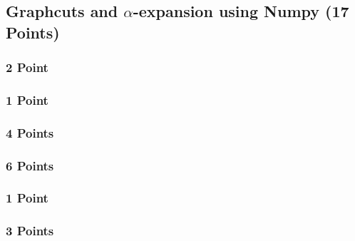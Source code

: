 \newif\ifvimbug
\vimbugfalse

\ifvimbug

\fi


\subsection{Graphcuts and $\alpha$-expansion using Numpy (17 Points)}
\subsubsection{2 Point}

\subsubsection{1 Point}

\subsubsection{4 Points}
	
\subsubsection{6 Points}

\subsubsection{1 Point}

\subsubsection{3 Points}














